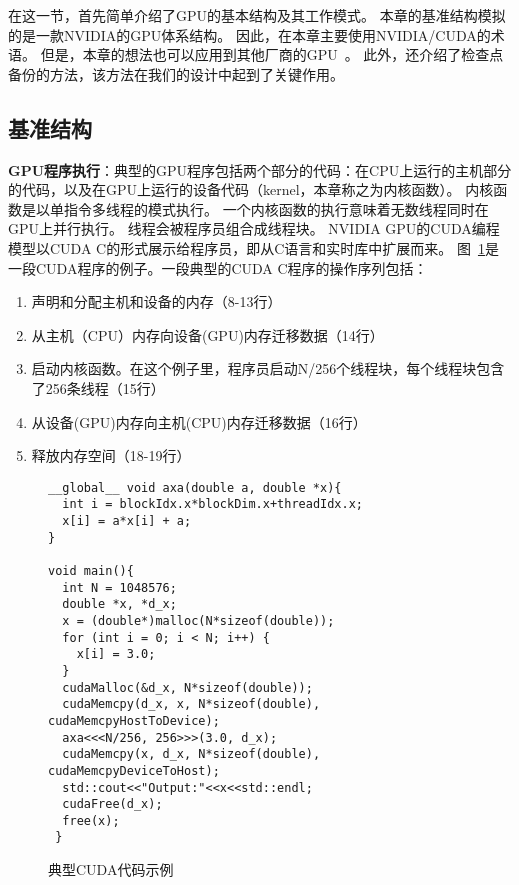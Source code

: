 在这一节，首先简单介绍了GPU的基本结构及其工作模式。
本章的基准结构模拟的是一款NVIDIA的GPU体系结构。
因此，在本章主要使用NVIDIA/CUDA的术语。
但是，本章的想法也可以应用到其他厂商的GPU~。
此外，还介绍了检查点备份的方法，该方法在我们的设计中起到了关键作用。

\subsection{基准结构}

\textbf{GPU程序执行}：典型的GPU程序包括两个部分的代码：在CPU上运行的主机部分的代码，以及在GPU上运行的设备代码（kernel，本章称之为内核函数）。
内核函数是以单指令多线程的模式执行。
一个内核函数的执行意味着无数线程同时在GPU上并行执行。
线程会被程序员组合成线程块。
NVIDIA GPU的CUDA编程模型以CUDA C的形式展示给程序员，即从C语言和实时库中扩展而来。
图~\ref{fig:cuda_code}是一段CUDA程序的例子。一段典型的CUDA C程序的操作序列包括：
\renewcommand*\theenumi{(\alph{enumi})}
\begin{enumerate}
\setlength\itemsep{1pt}
\item 声明和分配主机和设备的内存（8-13行）
\item 从主机（CPU）内存向设备(GPU)内存迁移数据（14行）
\item 启动内核函数。在这个例子里，程序员启动N/256个线程块，每个线程块包含了256条线程（15行）
\item 从设备(GPU)内存向主机(CPU)内存迁移数据（16行）
\item 释放内存空间（18-19行）
\end{enumerate}


\begin{figure}[htbp] 
  \centering
  \begin{lstlisting}[language={[ANSI]C}]
__global__ void axa(double a, double *x){
  int i = blockIdx.x*blockDim.x+threadIdx.x;
  x[i] = a*x[i] + a;
}

void main(){
  int N = 1048576;
  double *x, *d_x;
  x = (double*)malloc(N*sizeof(double));
  for (int i = 0; i < N; i++) {
  	x[i] = 3.0;
  } 
  cudaMalloc(&d_x, N*sizeof(double)); 
  cudaMemcpy(d_x, x, N*sizeof(double), cudaMemcpyHostToDevice);  
  axa<<<N/256, 256>>>(3.0, d_x);
  cudaMemcpy(x, d_x, N*sizeof(double), cudaMemcpyDeviceToHost);
  std::cout<<"Output:"<<x<<std::endl;
  cudaFree(d_x);
  free(x);
 }
  \end{lstlisting} 
\caption{典型CUDA代码示例}
\label{fig:cuda_code}
\end{figure}



